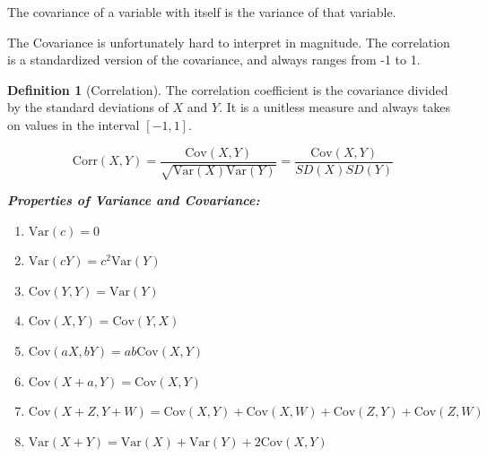 \documentclass[
]{book}
\providecommand{\tightlist}{%
  \setlength{\itemsep}{0pt}\setlength{\parskip}{0pt}}
\theoremstyle{definition}
\newtheorem{definition}{Definition}[chapter]
\theoremstyle{definition}
\theoremstyle{definition}
\theoremstyle{definition}
\theoremstyle{remark}
\begin{document}
The covariance of a variable with itself is the variance of that variable.

The Covariance is unfortunately hard to interpret in magnitude. The correlation is a standardized version of the covariance, and always ranges from -1 to 1.

\begin{definition}[Correlation]
\protect\hypertarget{def:unnamed-chunk-273}{}{\label{def:unnamed-chunk-273} {} }The correlation coefficient is the covariance divided by the standard deviations of \(X\) and \(Y\). It is a unitless measure and always takes on values in the interval \([-1,1]\).

\[\text{Corr}(X, Y) = \frac{\text{Cov}(X,Y)}{\sqrt{\text{Var}(X)\text{Var}(Y)}} = \frac{\text{Cov}(X,Y)}{SD(X)SD(Y)}\]
\end{definition}

\textbf{\emph{Properties of Variance and Covariance:}}

\begin{enumerate}
\def\labelenumi{\arabic{enumi}.}
\tightlist
\item
  \(\text{Var}(c) = 0\)
\item
  \(\text{Var}(cY) = c^2 \text{Var}(Y)\)
\item
  \(\text{Cov}(Y,Y) = \text{Var}(Y)\)
\item
  \(\text{Cov}(X,Y) = \text{Cov}(Y,X)\)
\item
  \(\text{Cov}(aX,bY) = ab \text{Cov}(X,Y)\)
\item
  \(\text{Cov}(X+a,Y) = \text{Cov}(X,Y)\)
\item
  \(\text{Cov}(X+Z,Y+W) = \text{Cov}(X,Y) + \text{Cov}(X,W) + \text{Cov}(Z,Y) + \text{Cov}(Z,W)\)
\item
  \(\text{Var}(X+Y) = \text{Var}(X) + \text{Var}(Y) + 2\text{Cov}(X,Y)\)
\end{enumerate}
\end{document}
